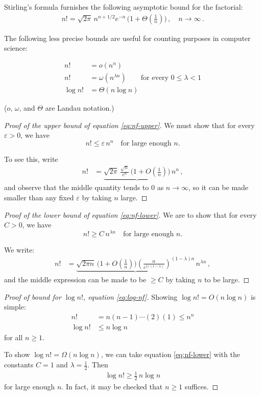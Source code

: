 \documentclass[12pt]{article}
\begin{document}
Stirling's formula furnishes the following asymptotic
bound for the factorial:
\begin{align*}
n! = \sqrt{2\pi} \, n^{n+1/2} e^{-n} \, \bigl( 1+ \Theta(\tfrac 1 n) \bigr)\,, \quad n \to \infty\,.
\end{align*}

The following less precise bounds are useful for counting purposes
in computer science:

\begin{align}
n! &= o(n^n) \label{eq:nf-upper} \\
n! &= \omega(n^{\lambda n}) \qquad \text{for every $0 \leq \lambda < 1$} \label{eq:nf-lower} \\
\log n! &= \Theta(n \log n) \label{eq:log-nf}
\end{align}

($o$, $\omega$, and $\Theta$ are Landau notation.)

\begin{proof}[Proof of the upper bound of equation \eqref{eq:nf-upper}]
We must show that for every $\varepsilon > 0$, we have
\[
n! \leq \varepsilon \, n^n \quad \text{for large enough $n$.}
\]

To see this, write
\begin{align*}
n! &= \underbrace{\sqrt{2\pi} \, \frac{\sqrt{n}}{e^n} \, \bigl(1 + O(\tfrac 1 n) \bigr)} \, n^n\,,
\end{align*}
and observe that the middle quantity tends to $0$ as 
$n \to \infty$, 
so it can be made smaller than any fixed $\varepsilon$
by taking $n$ large.
\end{proof}

\begin{proof}[Proof of the lower bound of equation \eqref{eq:nf-lower}]
We are to show that for every $C > 0$, we have
\[
n! \geq C \, n^{\lambda n} \quad \text{for large enough $n$.}
\]

We write:
\begin{align*}
n! &= \underbrace{\sqrt{2\pi n} \, \bigl( 1+O(\tfrac 1 n) \bigr) 
\left(\frac{n}{e^{1/(1-\lambda)}}\right)^{(1-\lambda) n}} \, n^{\lambda n}\,,
\end{align*}
and the middle expression can be made to be $\geq C$ 
by taking $n$ to be large.
\end{proof}

\begin{proof}[Proof of bound for $\log n!$, equation \eqref{eq:log-nf}]
Showing $\log n! = O (n \log n)$
is simple:
\begin{align*}
n! &= n(n-1)\dotsm(2)(1) \leq n^n \\
\log n! &\leq n \log n
\end{align*}
for all $n \geq 1$.

To show $\log n! = \Omega (n \log n)$,
we can take equation \eqref{eq:nf-lower} with the constants $C = 1$
and $\lambda = \tfrac 1 2$.  Then
\begin{align*}
\log n! \geq \tfrac 1 2 \, n \log n 
\end{align*}
for large enough $n$.  In fact, it may be checked that $n \geq 1$ suffices.
\end{proof}
\end{document}
